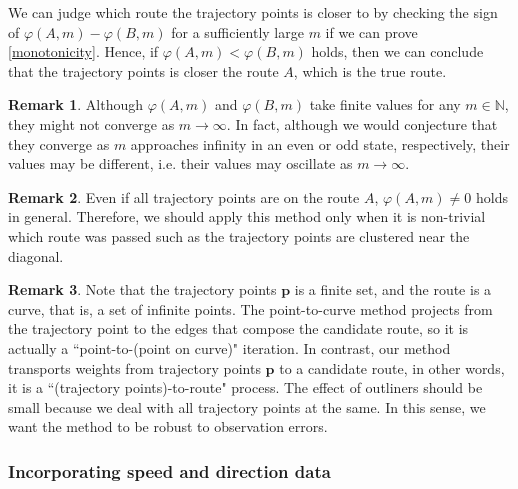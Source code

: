 \documentclass{article}
\numberwithin{equation}{section}
\theoremstyle{definition}
\newtheorem{remark}[remark]{Remark}
\newcommand{\N}{\mathbb{N}}
\begin{document}
We can judge which route the trajectory points is closer to by checking the sign of $\varphi(A,m)-\varphi(B,m)$ for a sufficiently large $m$ if we can prove \autoref{monotonicity}.
Hence, if $\varphi(A,m)<\varphi(B,m)$ holds, then we can conclude that the trajectory points is closer the route $A$, which is the true route.

\begin{remark}
Although $\varphi(A,m)$ and $\varphi(B,m)$ take finite values for any $m\in\N$, they might not converge as $m\to\infty$.
In fact, although we would conjecture that they converge as $m$ approaches infinity in an even or odd state, respectively, their values may be different, i.e. their values may oscillate as $m\to\infty$.
\end{remark}

\begin{remark}
Even if all trajectory points are on the route $A$, $\varphi(A,m)\neq0$ holds in general.
Therefore, we should apply this method only when it is non-trivial which route was passed such as the trajectory points are clustered near the diagonal.
\end{remark}

\begin{remark}
Note that the trajectory points $\mathbf{p}$ is a finite set, and the route is a curve, that is, a set of infinite points.
The point-to-curve method projects from the trajectory point to the edges that compose the candidate route, so it is actually a ``point-to-(point on curve)" iteration.
In contrast, our method transports weights from trajectory points $\mathbf{p}$ to a candidate route, in other words, it is a ``(trajectory  points)-to-route" process.
The effect of outliners should be small because we deal with all trajectory points at the same.
In this sense, we want the method to be robust to observation errors.
\end{remark}


\subsubsection*{Incorporating speed and direction data}
\end{document}
